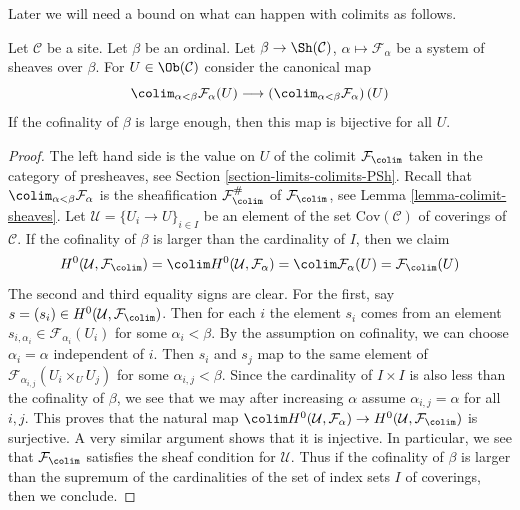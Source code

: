 \noindent
Later we will need a bound on what can happen with colimits as follows.

\begin{lemma}
\label{lemma-colimit-over-ordinal-sections}
Let $\mathcal{C}$ be a site. Let $\beta$ be an ordinal.
Let $\beta \to \Sh(\mathcal{C})$, $\alpha \mapsto \mathcal{F}_\alpha$
be a system of sheaves over $\beta$. For $U \in \Ob(\mathcal{C})$
consider the canonical map
$$
\colim_{\alpha < \beta} \mathcal{F}_\alpha(U)
\longrightarrow
\left(\colim_{\alpha < \beta} \mathcal{F}_\alpha \right)(U)
$$
If the cofinality of $\beta$ is large enough, then this map
is bijective for all $U$.
\end{lemma}

\begin{proof}
The left hand side is the value on $U$ of the colimit $\mathcal{F}_{\colim}$
taken in the category of presheaves, see
Section \ref{section-limits-colimits-PSh}.
Recall that $\colim_{\alpha < \beta} \mathcal{F}_\alpha$ is the
sheafification $\mathcal{F}_{\colim}^\#$ of $\mathcal{F}_{\colim}$, see
Lemma \ref{lemma-colimit-sheaves}.
Let $\mathcal{U} = \{U_i \to U\}_{i \in I}$ be an element of the
set $\text{Cov}(\mathcal{C})$ of coverings of $\mathcal{C}$.
If the cofinality of $\beta$ is larger than the
cardinality of $I$, then we claim
$$
H^0(\mathcal{U}, \mathcal{F}_{\colim}) =
\colim H^0(\mathcal{U}, \mathcal{F}_\alpha) =
\colim \mathcal{F}_\alpha(U) = \mathcal{F}_{\colim}(U)
$$
The second and third equality signs are clear. For the first, say
$s = (s_i) \in H^0(\mathcal{U}, \mathcal{F}_{\colim})$.
Then for each $i$ the element $s_i$ comes from an element
$s_{i, \alpha_i} \in \mathcal{F}_{\alpha_i}(U_i)$ for some
$\alpha_i < \beta$. By the assumption on cofinality, we can choose
$\alpha_i = \alpha$ independent of $i$. Then $s_i$ and $s_j$
map to the same element of $\mathcal{F}_{\alpha_{i, j}}(U_i \times_U U_j)$
for some $\alpha_{i, j} < \beta$. Since the cardinality of
$I \times I$ is also less than the cofinality of $\beta$, we see
that we may after increasing $\alpha$ assume $\alpha_{i, j} = \alpha$
for all $i, j$. This proves that the natural map
$\colim H^0(\mathcal{U}, \mathcal{F}_\alpha)
\to H^0(\mathcal{U}, \mathcal{F}_{\colim})$ is surjective.
A very similar argument shows that it is injective.
In particular, we see that $\mathcal{F}_{\colim}$ satisfies
the sheaf condition for $\mathcal{U}$.
Thus if the cofinality of $\beta$ is larger than the
supremum of the cardinalities of the set of index sets $I$
of coverings, then we conclude.
\end{proof}






